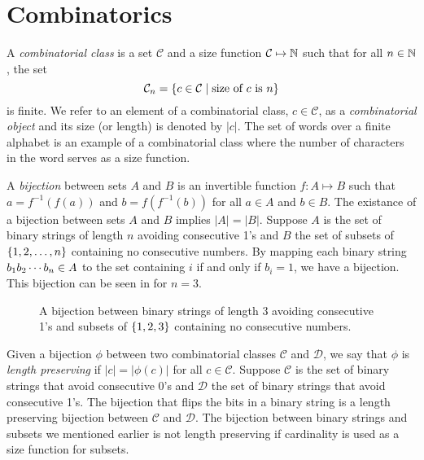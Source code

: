 \label{ch:backgr}
\section{Combinatorics\label{sec:combinatorics}}
A \emph{combinatorial class} is a set $\mathcal{C}$ and a size function $\mathcal{C} \mapsto \mathbb{N}$ such that for all $n\in\mathbb{N}$, the set
\[
    \mathcal{C}_n = \left\{c \in \mathcal{C} \mid \text{size of $c$ is $n$}\right\}
\]
is finite. We refer to an element of a combinatorial class, $c\in\mathcal{C}$, as a \emph{combinatorial object} and its size (or length) is denoted by $|c|$. The set of words over a finite alphabet is an example of a combinatorial class where the number of characters in the word serves as a size function.

A \emph{bijection} between sets $A$ and $B$ is an invertible function $f: A \mapsto B$ such that $a=f^{-1}(f(a))$ and $b=f(f^{-1}(b))$ for all $a\in A$ and $b \in B$. The existance of a bijection between sets $A$ and $B$ implies $|A|=|B|$. Suppose $A$ is the set of binary strings of length $n$ avoiding consecutive 1's and $B$ the set of subsets of $\left\{1,2,\dotsc,n\right\}$ containing no consecutive numbers. By mapping each binary string $b_1 b_2 \dotsm b_{n} \in A$ to the set containing $i$ if and only if $b_i=1$, we have a bijection. This bijection can be seen in  for $n=3$.

\begin{figure}[ht!]
    \centering
    
    \caption{A bijection between binary strings of length 3 avoiding consecutive 1's and subsets of $\left\{1,2,3\right\}$ containing no consecutive numbers.}
    \label{fig:bijection_example}
\end{figure}

Given a bijection $\phi$ between two combinatorial classes $\mathcal{C}$ and $\mathcal{D}$, we say that $\phi$ is \emph{length preserving} if $|c| = |\phi(c)|$ for all $c\in\mathcal{C}$. Suppose $\mathcal{C}$ is the set of binary strings that avoid consecutive 0's and $\mathcal{D}$ the set of binary strings that avoid consecutive 1's. The bijection that flips the bits in a binary string is a length preserving bijection between $\mathcal{C}$ and $\mathcal{D}$. The bijection between binary strings and subsets we mentioned earlier is not length preserving if cardinality is used as a size function for subsets.

